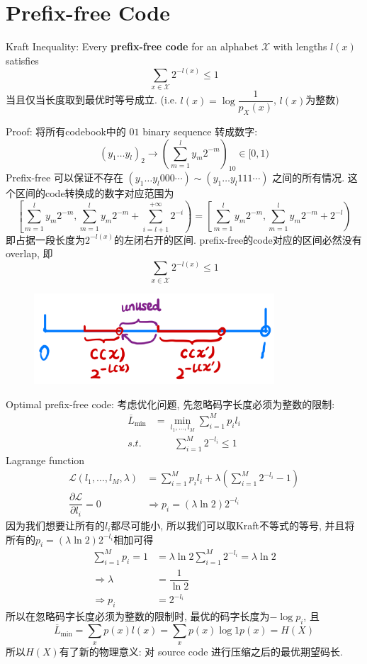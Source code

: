 \section{Prefix-free Code}
\begin{theorem}
Kraft Inequality: Every \textbf{prefix-free code} for an alphabet $\mathcal{X}$ with lengths $l(x)$ satisfies
$$\sum_{x\in\mathcal{X}}2^{-l(x)}\leq 1$$
当且仅当长度取到最优时等号成立. (i.e. $l(x)=\log\dfrac{1}{p_X(x)}$, $l(x)$为整数)
\end{theorem}

Proof: 将所有codebook中的 $01$ binary sequence 转成数字:
$$\left(y_1\ldots y_l\right)_2\to \left(\sum\limits_{m=1}^ly_m2^{-m}\right)_{10}\in[0,1)$$
Prefix-free 可以保证不存在 $\left(y_1\ldots y_l000\cdots\right)\sim\left(y_1\ldots y_l111\cdots\right)$ 之间的所有情况. 这个区间的code转换成的数字对应范围为
$$\left[\sum_{m=1}^ly_m2^{-m},\sum_{m=1}^ly_m2^{-m}+\sum_{i=l+1}^{+\infty}2^{-i}\right)=\left[\sum_{m=1}^ly_m2^{-m},\sum_{m=1}^ly_m2^{-m}+2^{-l}\right)$$
即占据一段长度为$2^{-l(x)}$的左闭右开的区间. prefix-free的code对应的区间必然没有overlap, 即
$$\sum_{x\in\mathcal{X}}2^{-l(x)}\leq 1$$

\begin{figure}[htbp]
    \centering
    \includegraphics[width=0.8\textwidth]{./figures/chapter3/kraft_inequality.png}
\end{figure}

Optimal prefix-free code: 考虑优化问题, 先忽略码字长度必须为整数的限制:
\begin{align*}
\overline{L}_{\min} &= \min_{l_1,\ldots,l_M} \sum_{i=1}^M p_i l_i \\
s.t. &\qquad \sum_{i=1}^M 2^{-l_i} \leq 1
\end{align*}
Lagrange function
\begin{align*}
\mathcal{L}(l_1,\ldots,l_M,\lambda) &= \sum_{i=1}^M p_i l_i + \lambda \left(\sum_{i=1}^M 2^{-l_i} - 1\right) \\
\dfrac{\partial \mathcal{L}}{\partial l_i} = 0 &\Rightarrow p_i = \left(\lambda\ln 2\right) 2^{-l_i}
\end{align*}
因为我们想要让所有的$l_i$都尽可能小, 所以我们可以取Kraft不等式的等号, 并且将所有的$p_i = \left(\lambda\ln 2\right) 2^{-l_i}$相加可得
\begin{align*}
\sum_{i=1}^M p_i = 1 &= \lambda \ln 2 \sum_{i=1}^M 2^{-l_i} = \lambda \ln 2 \\
\Rightarrow \lambda &= \dfrac{1}{\ln 2} \\
\Rightarrow p_i &= 2^{-l_i}
\end{align*}
所以在忽略码字长度必须为整数的限制时, 最优的码字长度为$-\log p_i$, 且
$$\overline{L}_{\min} = \sum_{x}p(x)l(x)=\sum_{x}p(x)\log {1}{p(x)} = H(X)$$
所以$H(X)$有了新的物理意义: 对 source code 进行压缩之后的最优期望码长.

